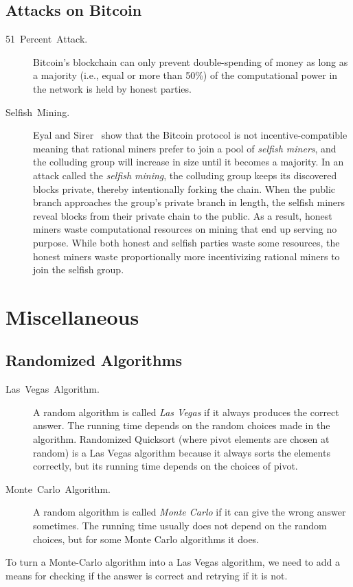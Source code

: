 \documentclass[11pt]{article}
\theoremstyle{plain}
\begin{document}
\subsection{Attacks on Bitcoin}
\begin{description}
	\item [{51~Percent~Attack.}] Bitcoin's blockchain can only prevent double-spending
	of money as long as a majority (i.e., equal or more than 50\%) of
	the computational power in the network is held by honest parties.
	\item [{Selfish~Mining.}] Eyal and Sirer~\cite{Eyal2014} show that the
	Bitcoin protocol is not incentive-compatible meaning that rational
	miners prefer to join a pool of \emph{selfish miners}, and the colluding
	group will increase in size until it becomes a majority. In an attack
	called the \emph{selfish mining}, the colluding group keeps its discovered
	blocks private, thereby intentionally forking the chain. When the
	public branch approaches the group's private branch in length, the
	selfish miners reveal blocks from their private chain to the public.
	As a result, honest miners waste computational resources on mining
	that end up serving no purpose. While both honest and selfish parties
	waste some resources, the honest miners waste proportionally more
	incentivizing rational miners to join the selfish group.
\end{description}

\section{Miscellaneous}

\subsection{Randomized Algorithms}
\begin{description}
	\item [{Las~Vegas~Algorithm.}] A random algorithm is called \emph{Las
		Vegas} if it always produces the correct answer. The running time
	depends on the random choices made in the algorithm. Randomized Quicksort
	(where pivot elements are chosen at random) is a Las Vegas algorithm
	because it always sorts the elements correctly, but its running time
	depends on the choices of pivot.
	\item [{Monte~Carlo~Algorithm.}] A random algorithm is called \emph{Monte
		Carlo} if it can give the wrong answer sometimes. The running time
	usually does not depend on the random choices, but for some Monte
	Carlo algorithms it does.
\end{description}
To turn a Monte-Carlo algorithm into a Las Vegas algorithm, we need
to add a means for checking if the answer is correct and retrying
if it is not.
\end{document}
